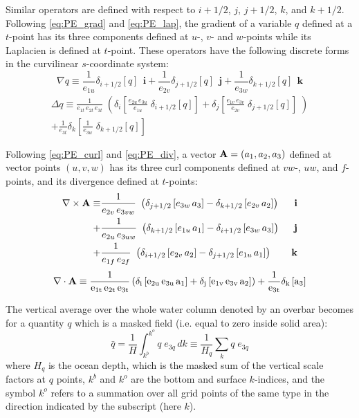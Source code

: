 \documentclass[../main/NEMO_manual]{subfiles}
\begin{document}
Similar operators are defined with respect to $i+1/2$, $j$, $j+1/2$, $k$, and $k+1/2$.
Following \autoref{eq:PE_grad} and \autoref{eq:PE_lap}, the gradient of a variable $q$ defined at
a $t$-point has its three components defined at $u$-, $v$- and $w$-points while
its Laplacien is defined at $t$-point.
These operators have the following discrete forms in the curvilinear $s$-coordinate system:
\[
  \nabla q\equiv 	\frac{1}{e_{1u} } \delta_{i+1/2 } [q] \;\,\mathbf{i}
  +	\frac{1}{e_{2v} } \delta_{j+1/2 } [q] \;\,\mathbf{j}
  +	\frac{1}{e_{3w}} \delta_{k+1/2} [q] \;\,\mathbf{k}
\]
\begin{multline*}
  \Delta q\equiv \frac{1}{e_{1t}\,e_{2t}\,e_{3t} }
  \;\left(          \delta_i  \left[ \frac{e_{2u}\,e_{3u}} {e_{1u}} \;\delta_{i+1/2} [q] \right]
    +                        \delta_j  \left[ \frac{e_{1v}\,e_{3v}}  {e_{2v}} \;\delta_{j+1/2} [q] \right] \;  \right)		\\
  +\frac{1}{e_{3t}} \delta_k \left[ \frac{1}{e_{3w} }                     \;\delta_{k+1/2} [q] \right]
\end{multline*}

Following \autoref{eq:PE_curl} and \autoref{eq:PE_div}, a vector ${\rm {\bf A}}=\left( a_1,a_2,a_3\right)$
defined at vector points $(u,v,w)$ has its three curl components defined at $vw$-, $uw$, and $f$-points,
and its divergence defined at $t$-points:
\begin{align*}
  \nabla \times {\rm{\bf A}}\equiv &
                                     \frac{1}{e_{2v}\,e_{3vw} } \ \left( \delta_{j +1/2} \left[e_{3w}\,a_3 \right] -\delta_{k+1/2} \left[e_{2v} \,a_2 \right] \right)  &\ \mathbf{i} \\
  +& \frac{1}{e_{2u}\,e_{3uw}} \ \left( \delta_{k+1/2} \left[e_{1u}\,a_1  \right] -\delta_{i +1/2} \left[e_{3w}\,a_3 \right] \right)  &\ \mathbf{j} \\
  +& \frac{1}{e_{1f} \,e_{2f}    } \ \left( \delta_{i +1/2} \left[e_{2v}\,a_2  \right] -\delta_{j +1/2} \left[e_{1u}\,a_1 \right] \right)  &\ \mathbf{k}
\end{align*}
\begin{align*}
  \nabla \cdot \rm{\bf A} \equiv
  \frac{1}{e_{1t}\,e_{2t}\,e_{3t}} \left( \delta_i \left[e_{2u}\,e_{3u}\,a_1 \right]
  +\delta_j \left[e_{1v}\,e_{3v}\,a_2 \right] \right)+\frac{1}{e_{3t} }\delta_k \left[a_3 \right]
\end{align*}

The vertical average over the whole water column denoted by an overbar becomes for a quantity $q$ which
is a masked field (i.e. equal to zero inside solid area):
\begin{equation}
  \label{eq:DOM_bar}
  \bar q 	=         \frac{1}{H}    \int_{k^b}^{k^o} {q\;e_{3q} \,dk}
  \equiv \frac{1}{H_q }\sum\limits_k {q\;e_{3q} }
\end{equation}
where $H_q$  is the ocean depth, which is the masked sum of the vertical scale factors at $q$ points,
$k^b$ and $k^o$ are the bottom and surface $k$-indices,
and the symbol $k^o$ refers to a summation over all grid points of the same type in the direction indicated by
the subscript (here $k$). 
\end{document}
